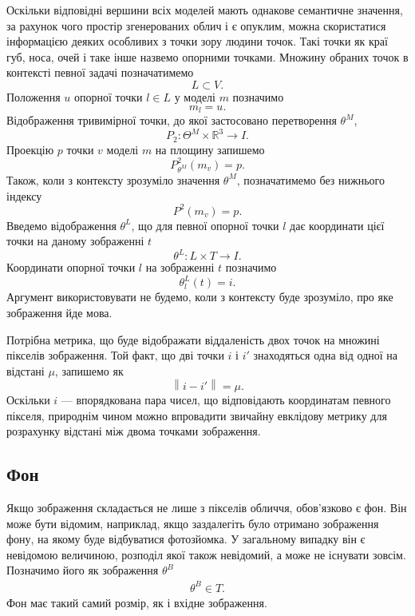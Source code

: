 Оскільки відповідні вершини всіх моделей мають однакове семантичне значення,
за рахунок чого простір згенерованих облич і є опуклим,
можна скористатися інформацією деяких особливих з точки зору людини точок.
Такі точки як краї губ, носа, очей і таке інше назвемо опорними точками.
Множину обраних точок в контексті певної задачі позначатимемо
\begin{equation*}
  L \subset V.
\end{equation*}
Положення $u$ опорної точки $l \in L$ у моделі $m$ позначимо
\begin{equation*}
  m_{l} = u.
\end{equation*}
Відображення тривимірної точки,
до якої застосовано перетворення $\theta^M$,
\begin{equation*}
  P_2: \Theta^M \times \mathbb{R}^3 \rightarrow I.
\end{equation*}
Проекцію $p$ точки $v$ моделі $m$ на площину запишемо
\begin{equation*}
  P^2_{\theta^M}\left( m_v \right) = p.
\end{equation*}
Також, коли з контексту зрозуміло значення $\theta^M$,
позначатимемо без нижнього індексу
\begin{equation*}
  P^2\left( m_v \right) = p.
\end{equation*}
Введемо відображення $\theta^L$,
що для певної опорної точки $l$
дає координати цієї точки на даному зображенні $t$
\begin{equation*}
  \theta^L: L \times T \rightarrow I.
\end{equation*}
Координати опорної точки $l$ на зображенні $t$ позначимо
\begin{equation*}
  \theta_l^L\left( t \right) = i.
\end{equation*}
Аргумент використовувати не будемо, коли з контексту буде зрозуміло,
про яке зображення йде мова.

Потрібна метрика,
що буде відображати віддаленість двох точок на множині пікселів зображення.
Той факт,
що дві точки $i$ і $i'$ знаходяться одна від одної на відстані $\mu$,
запишемо як
\begin{equation*}
  \left\| i - i' \right\| = \mu.
\end{equation*}
Оскільки $i$ --- впорядкована пара чисел,
що відповідають координатам певного пікселя,
природнім чином можно впровадити звичайну евклідову метрику
для розрахунку відстані між двома точками зображення.

\subsection{Фон}
Якщо зображення складається не лише з пікселів обличчя,
обов'язково є фон.
Він може бути відомим, наприклад,
якщо заздалегіть було отримано зображення фону,
на якому буде відбуватися фотозйомка.
У загальному випадку він є невідомою величиною,
розподіл якої також невідомий,
а може не існувати зовсім.
Позначимо його як зображення $\theta^B$
\begin{align*}
  \theta^B \in T.
\end{align*}
Фон має такий самий розмір, як і вхідне зображення.

